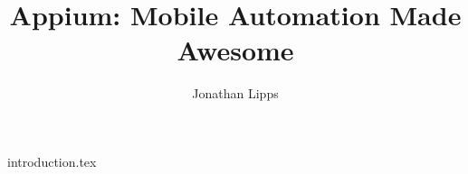 \documentclass{book}
\begin{document}
\title{Appium: Mobile Automation Made Awesome}
\author{Jonathan Lipps}
\maketitle

{introduction.tex}
\end{document}
